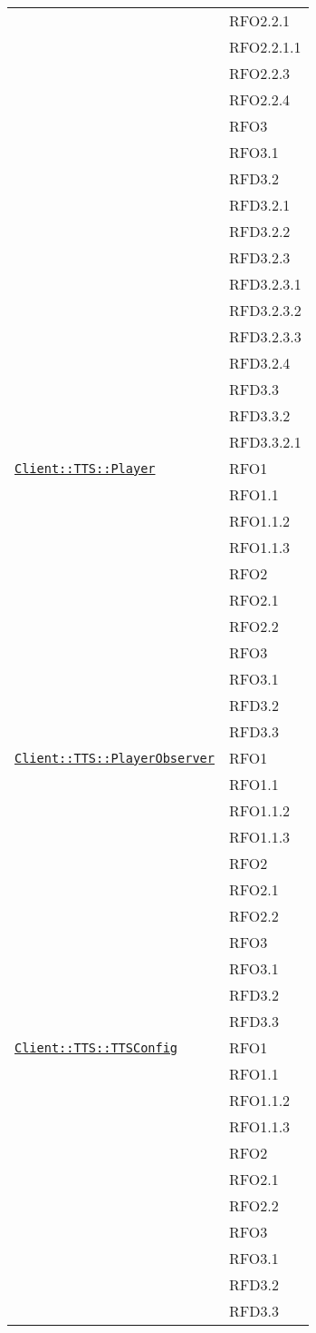 \begin{longtable}{|>{\centering}m{10cm}|m{3cm}<{\centering}|}
& RFO2.2.1\\
& RFO2.2.1.1\\
& RFO2.2.3\\
& RFO2.2.4\\
& RFO3\\
& RFO3.1\\
& RFD3.2\\
& RFD3.2.1\\
& RFD3.2.2\\
& RFD3.2.3\\
& RFD3.2.3.1\\
& RFD3.2.3.2\\
& RFD3.2.3.3\\
& RFD3.2.4\\
& RFD3.3\\
& RFD3.3.2\\
& RFD3.3.2.1\\ \hline

\hyperref[Client::TTS::Player]{\texttt{Client::TTS::Player}} & RFO1\\
& RFO1.1\\
& RFO1.1.2\\
& RFO1.1.3\\
& RFO2\\
& RFO2.1\\
& RFO2.2\\
& RFO3\\
& RFO3.1\\
& RFD3.2\\
& RFD3.3\\ \hline

\hyperref[Client::TTS::PlayerObserver]{\texttt{Client::TTS::PlayerObserver}} & RFO1\\
& RFO1.1\\
& RFO1.1.2\\
& RFO1.1.3\\
& RFO2\\
& RFO2.1\\
& RFO2.2\\
& RFO3\\
& RFO3.1\\
& RFD3.2\\
& RFD3.3\\ \hline

\hyperref[Client::TTS::TTSConfig]{\texttt{Client::TTS::TTSConfig}} & RFO1\\
& RFO1.1\\
& RFO1.1.2\\
& RFO1.1.3\\
& RFO2\\
& RFO2.1\\
& RFO2.2\\
& RFO3\\
& RFO3.1\\
& RFD3.2\\
& RFD3.3\\ \hline


\end{longtable}
